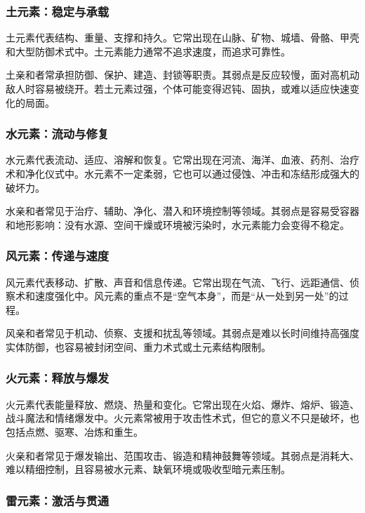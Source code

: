 \subsubsection{土元素：稳定与承载}

土元素代表结构、重量、支撑和持久。它常出现在山脉、矿物、城墙、骨骼、甲壳和大型防御术式中。土元素能力通常不追求速度，而追求可靠性。

土亲和者常承担防御、保护、建造、封锁等职责。其弱点是反应较慢，面对高机动敌人时容易被绕开。若土元素过强，个体可能变得迟钝、固执，或难以适应快速变化的局面。

\subsubsection{水元素：流动与修复}

水元素代表流动、适应、溶解和恢复。它常出现在河流、海洋、血液、药剂、治疗术和净化仪式中。水元素不一定柔弱，它也可以通过侵蚀、冲击和冻结形成强大的破坏力。

水亲和者常见于治疗、辅助、净化、潜入和环境控制等领域。其弱点是容易受容器和地形影响：没有水源、空间干燥或环境被污染时，水元素能力会变得不稳定。

\subsubsection{风元素：传递与速度}

风元素代表移动、扩散、声音和信息传递。它常出现在气流、飞行、远距通信、侦察术和速度强化中。风元素的重点不是“空气本身”，而是“从一处到另一处”的过程。

风亲和者常见于机动、侦察、支援和扰乱等领域。其弱点是难以长时间维持高强度实体防御，也容易被封闭空间、重力术式或土元素结构限制。

\subsubsection{火元素：释放与爆发}

火元素代表能量释放、燃烧、热量和变化。它常出现在火焰、爆炸、熔炉、锻造、战斗魔法和情绪爆发中。火元素常被用于攻击性术式，但它的意义不只是破坏，也包括点燃、驱寒、冶炼和重生。

火亲和者常见于爆发输出、范围攻击、锻造和精神鼓舞等领域。其弱点是消耗大、难以精细控制，且容易被水元素、缺氧环境或吸收型暗元素压制。

\subsubsection{雷元素：激活与贯通}

